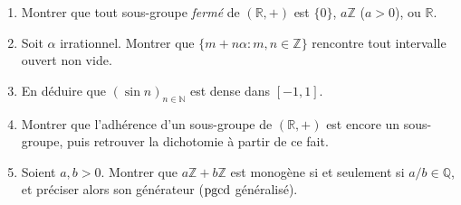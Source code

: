 \begin{mdframed}[style=exobar]
  \begin{enumerate}
    \item Montrer que tout sous-groupe \emph{fermé} de $(\mathbb{R},+)$ est
          $\{0\}$, $a\mathbb{Z}$ ($a>0$), ou $\mathbb{R}$.
    \item Soit $\alpha$ irrationnel. Montrer que $\{m + n\alpha : m,n \in \mathbb{Z}\}$
          rencontre tout intervalle ouvert non vide.
    \item En déduire que $(\sin n)_{n \in \mathbb{N}}$ est dense dans $[-1,1]$.
    \item Montrer que l'adhérence d'un sous-groupe de $(\mathbb{R},+)$ est encore
          un sous-groupe, puis retrouver la dichotomie à partir de ce fait.
    \item Soient $a, b > 0$. Montrer que $a\mathbb{Z} + b\mathbb{Z}$ est monogène
          si et seulement si $a/b \in \mathbb{Q}$, et préciser alors son générateur
          ($\operatorname{pgcd}$ généralisé).
  \end{enumerate}
\end{mdframed}

